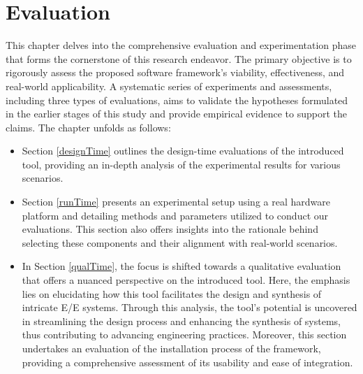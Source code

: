 \chapter{Evaluation}\label{eval}%


    This chapter delves into the comprehensive evaluation and experimentation phase that forms the cornerstone of this research endeavor. The primary objective is to rigorously assess the proposed software framework's viability, effectiveness, and real-world applicability. A systematic series of experiments and assessments, including three types of evaluations, aims to validate the hypotheses formulated in the earlier stages of this study and provide empirical evidence to support the claims. The chapter unfolds as follows: 
    
    \begin{itemize}
        \item  Section \ref{designTime} outlines the design-time evaluations of the introduced tool, providing an in-depth analysis of the experimental results for various scenarios.
        \item Section \ref{runTime} presents an experimental setup using a real hardware platform and detailing methods and parameters utilized to conduct our evaluations. This section also offers insights into the rationale behind selecting these components and their alignment with real-world scenarios.
        \item  In Section \ref{qualTime}, the focus is shifted towards a qualitative evaluation that offers a nuanced perspective on the introduced tool. Here, the emphasis lies on elucidating how this tool facilitates the design and synthesis of intricate E/E systems. Through this analysis, the tool's potential is uncovered in streamlining the design process and enhancing the synthesis of systems, thus contributing to advancing engineering practices. Moreover, this section undertakes an evaluation of the installation process of the framework, providing a comprehensive assessment of its usability and ease of integration.
    \end{itemize}
    
   
    
    
     
